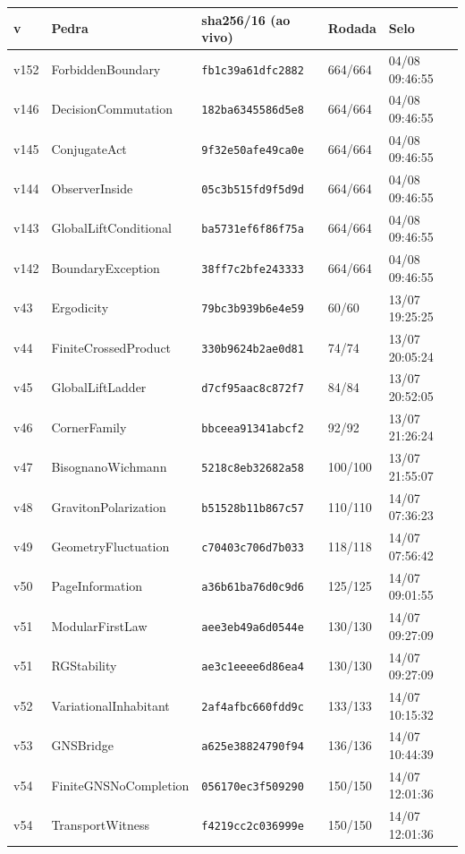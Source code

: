 \documentclass[11pt]{article}
\theoremstyle{definition}\newtheorem{deriv}{Derivação}
\begin{document}
{\small\begin{longtable}{@{}lllll@{}}\toprule v & Pedra & sha256/16 (ao vivo) & Rodada & Selo \\ \midrule\endhead 
v152 & ForbiddenBoundary & \texttt{fb1c39a61dfc2882} & 664/664 & 04/08 09:46:55 \\
v146 & DecisionCommutation & \texttt{182ba6345586d5e8} & 664/664 & 04/08 09:46:55 \\
v145 & ConjugateAct & \texttt{9f32e50afe49ca0e} & 664/664 & 04/08 09:46:55 \\
v144 & ObserverInside & \texttt{05c3b515fd9f5d9d} & 664/664 & 04/08 09:46:55 \\
v143 & GlobalLiftConditional & \texttt{ba5731ef6f86f75a} & 664/664 & 04/08 09:46:55 \\
v142 & BoundaryException & \texttt{38ff7c2bfe243333} & 664/664 & 04/08 09:46:55 \\
v43 & Ergodicity & \texttt{79bc3b939b6e4e59} & 60/60 & 13/07 19:25:25 \\
v44 & FiniteCrossedProduct & \texttt{330b9624b2ae0d81} & 74/74 & 13/07 20:05:24 \\
v45 & GlobalLiftLadder & \texttt{d7cf95aac8c872f7} & 84/84 & 13/07 20:52:05 \\
v46 & CornerFamily & \texttt{bbceea91341abcf2} & 92/92 & 13/07 21:26:24 \\
v47 & BisognanoWichmann & \texttt{5218c8eb32682a58} & 100/100 & 13/07 21:55:07 \\
v48 & GravitonPolarization & \texttt{b51528b11b867c57} & 110/110 & 14/07 07:36:23 \\
v49 & GeometryFluctuation & \texttt{c70403c706d7b033} & 118/118 & 14/07 07:56:42 \\
v50 & PageInformation & \texttt{a36b61ba76d0c9d6} & 125/125 & 14/07 09:01:55 \\
v51 & ModularFirstLaw & \texttt{aee3eb49a6d0544e} & 130/130 & 14/07 09:27:09 \\
v51 & RGStability & \texttt{ae3c1eeee6d86ea4} & 130/130 & 14/07 09:27:09 \\
v52 & VariationalInhabitant & \texttt{2af4afbc660fdd9c} & 133/133 & 14/07 10:15:32 \\
v53 & GNSBridge & \texttt{a625e38824790f94} & 136/136 & 14/07 10:44:39 \\
v54 & FiniteGNSNoCompletion & \texttt{056170ec3f509290} & 150/150 & 14/07 12:01:36 \\
v54 & TransportWitness & \texttt{f4219cc2c036999e} & 150/150 & 14/07 12:01:36 \\

\end{longtable}}
\end{document}
